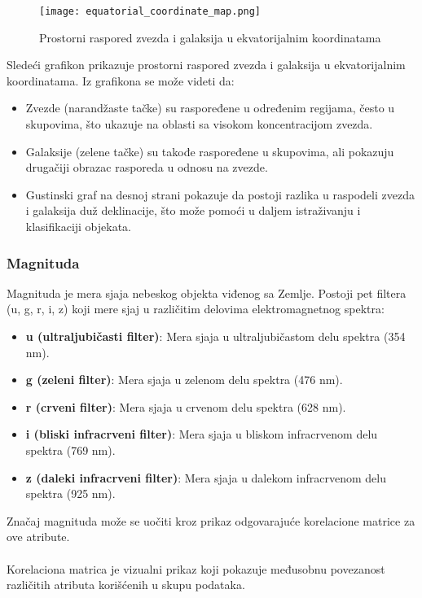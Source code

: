 \documentclass[a4paper,12pt]{article}
\begin{document}
\begin{figure}[h!]
\centering
\texttt{[image: equatorial\_coordinate\_map.png]}
\caption{Prostorni raspored zvezda i galaksija u ekvatorijalnim koordinatama}
\label{fig:equatorial_coordinates}
\end{figure}

Sledeći grafikon prikazuje prostorni raspored zvezda i galaksija u ekvatorijalnim koordinatama. Iz grafikona se može videti da:

\begin{itemize}
    \item Zvezde (narandžaste tačke) su raspoređene u određenim regijama, često u skupovima, što ukazuje na oblasti sa visokom koncentracijom zvezda.
    \item Galaksije (zelene tačke) su takođe raspoređene u skupovima, ali pokazuju drugačiji obrazac rasporeda u odnosu na zvezde.
    \item Gustinski graf na desnoj strani pokazuje da postoji razlika u raspodeli zvezda i galaksija duž deklinacije, što može pomoći u daljem istraživanju i klasifikaciji objekata.
\end{itemize}

\subsubsection{Magnituda}

Magnituda je mera sjaja nebeskog objekta viđenog sa Zemlje. Postoji pet filtera (u, g, r, i, z) koji mere sjaj u različitim delovima elektromagnetnog spektra:

\begin{itemize}
    \item \textbf{u (ultraljubičasti filter)}: Mera sjaja u ultraljubičastom delu spektra (354 nm).
    \item \textbf{g (zeleni filter)}: Mera sjaja u zelenom delu spektra (476 nm).
    \item \textbf{r (crveni filter)}: Mera sjaja u crvenom delu spektra (628 nm).
    \item \textbf{i (bliski infracrveni filter)}: Mera sjaja u bliskom infracrvenom delu spektra (769 nm).
    \item \textbf{z (daleki infracrveni filter)}: Mera sjaja u dalekom infracrvenom delu spektra (925 nm).
\end{itemize}
Značaj magnituda može se uočiti kroz prikaz odgovarajuće korelacione matrice za ove atribute.
\\\\Korelaciona matrica je vizualni prikaz koji pokazuje međusobnu povezanost različitih atributa korišćenih u skupu podataka.
\end{document}
